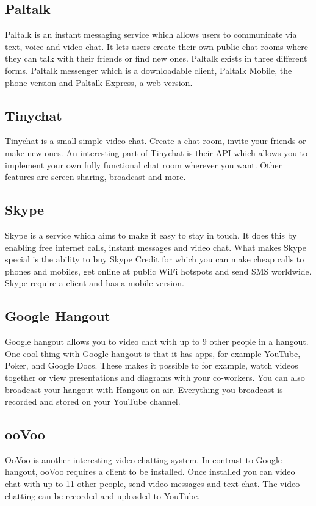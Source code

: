 \documentclass[12pt, titlepage]{article}
\begin{document}
\subsection{Paltalk}
Paltalk\cite{35} is an instant messaging service which allows users to communicate via text, voice and video chat. It lets users create their own public chat rooms where they can talk with their friends or find new ones. Paltalk exists in three different forms. Paltalk messenger which is a downloadable client, Paltalk Mobile, the phone version and Paltalk Express, a web version.
\subsection{Tinychat}
Tinychat\cite{35} is a small simple video chat. Create a chat room, invite your friends or make new ones. An interesting part of Tinychat is their API which allows you to implement your own fully functional chat room wherever you want. Other features are screen sharing, broadcast and more.
\subsection{Skype}
Skype\cite{10} is a service which aims to make it easy to stay in touch. It does this by enabling free internet calls, instant messages and video chat. What makes Skype special is the ability to buy Skype Credit for which you can make cheap calls to phones and mobiles, get online at public WiFi hotspots and send SMS worldwide. Skype require a client and has a mobile version.
\subsection{Google Hangout}
Google hangout\cite{6} allows you to video chat with up to 9 other people in a hangout. One cool thing with Google hangout is that it has apps, for example YouTube, Poker, and Google Docs. These makes it possible to for example, watch videos together or view presentations and diagrams with your co-workers. You can also broadcast your hangout with Hangout on air. Everything you broadcast is recorded and stored on your YouTube channel.
\subsection{ooVoo}
OoVoo\cite{7} is another interesting video chatting system. In contrast to Google hangout, ooVoo requires a client to be installed. Once installed you can video chat with up to 11 other people, send video messages and text chat. The video chatting can be recorded and uploaded to YouTube.
\end{document}

